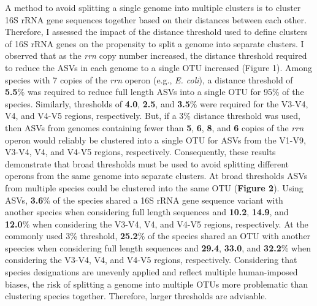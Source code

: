 \documentclass[
]{article}
\begin{document}
A method to avoid splitting a single genome into multiple clusters is to
cluster 16S rRNA gene sequences together based on their distances
between each other. Therefore, I assessed the impact of the distance
threshold used to define clusters of 16S rRNA genes on the propensity to
split a genome into separate clusters. I observed that as the \emph{rrn}
copy number increased, the distance threshold required to reduce the
ASVs in each genome to a single OTU increased (Figure 1). Among species
with 7 copies of the \emph{rrn} operon (e.g., \emph{E. coli}), a
distance threshold of \textbf{5.5}\% was required to reduce full length
ASVs into a single OTU for 95\% of the species. Similarly, thresholds of
\textbf{4.0}, \textbf{2.5}, and \textbf{3.5}\% were required for the
V3-V4, V4, and V4-V5 regions, respectively. But, if a 3\% distance
threshold was used, then ASVs from genomes containing fewer than
\textbf{5}, \textbf{6}, \textbf{8}, and \textbf{6} copies of the
\emph{rrn} operon would reliably be clustered into a single OTU for ASVs
from the V1-V9, V3-V4, V4, and V4-V5 regions, respectively.
Consequently, these results demonstrate that broad thresholds must be
used to avoid splitting different operons from the same genome into
separate clusters. At broad thresholds ASVs from multiple species could
be clustered into the same OTU (\textbf{Figure 2}). Using ASVs,
\textbf{3.6}\% of the species shared a 16S rRNA gene sequence variant
with another species when considering full length sequences and
\textbf{10.2}, \textbf{14.9}, and \textbf{12.0}\% when considering the
V3-V4, V4, and V4-V5 regions, respectively. At the commonly used 3\%
threshold, \textbf{25.2}\% of the species shared an OTU with another
speecies when considering full length sequences and \textbf{29.4},
\textbf{33.0}, and \textbf{32.2}\% when considering the V3-V4, V4, and
V4-V5 regions, respectively. Considering that species designations are
unevenly applied and reflect multiple human-imposed biases, the risk of
splitting a genome into multiple OTUs more problematic than clustering
species together. Therefore, larger thresholds are advisable.
\end{document}
